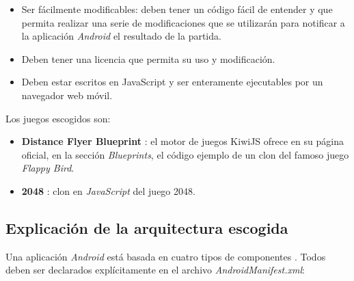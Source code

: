\documentclass[twoside]{report}
\begin{document}
\begin{itemize}
\item Ser fácilmente modificables: deben tener un código fácil de entender y que permita realizar una serie de modificaciones que se utilizarán para notificar a la aplicación \textit{Android} el resultado de la partida.

\item Deben tener una licencia que permita su uso y modificación.

\item Deben estar escritos en JavaScript y ser enteramente ejecutables por un navegador web móvil.
\end{itemize}

Los juegos escogidos son:

\begin{itemize}
\item \textbf{Distance Flyer Blueprint} \cite{distancegame}: el motor de juegos KiwiJS ofrece en su página oficial, en la sección \textit{Blueprints}, el código ejemplo de un clon del famoso juego \textit{Flappy Bird}.

\item \textbf{2048} \cite{2048game}: clon en \textit{JavaScript} del juego 2048.
\end{itemize}

\subsection{Explicación de la arquitectura escogida}

Una aplicación \textit{Android} está basada en cuatro tipos de componentes \cite{androidfund} \cite{androidpacktpub}. Todos deben ser declarados explícitamente en el archivo \textit{AndroidManifest.xml}:
\end{document}
